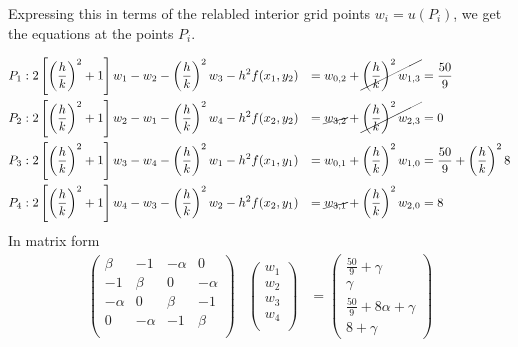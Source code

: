 \documentclass[12pt]{article}
\begin{document}
Expressing this in terms of the relabled interior grid points
$w_i=u(P_i)$, we get the equations at the points $P_i$.

\begin{equation}
  \label{eq:8_p}
  \begin{aligned}
    P_1&: 2\left[\left(\frac{h}{k}\right)^2+1\right]w_1 - w_2 -
    \left(\frac{h}{k}\right)^2w_3 -
    h^2f(x_1,y_2)&=w_{0,2}+\cancel{\left(\frac{h}{k}\right)^2w_{1,3}} &=
    \frac{50}{9} \\
    P_2&: 2\left[\left(\frac{h}{k}\right)^2+1\right]w_2 - w_1 -
    \left(\frac{h}{k}\right)^2w_4 -
    h^2f(x_2,y_2)&=\cancel{w_{3,2}} +
    \cancel{\left(\frac{h}{k}\right)^2w_{2,3}} &=
    0\\
    P_3&: 2\left[\left(\frac{h}{k}\right)^2+1\right]w_3 - w_4 -
    \left(\frac{h}{k}\right)^2w_1 -
    h^2f(x_1,y_1)&=w_{0,1}+\left(\frac{h}{k}\right)^2w_{1,0} &= 
    \frac{50}{9} + \left(\frac{h}{k}\right)^28 \\
    P_4&: 2\left[\left(\frac{h}{k}\right)^2+1\right]w_4 - w_3 -
    \left(\frac{h}{k}\right)^2w_2 -
    h^2f(x_2,y_1)&=\cancel{w_{3,1}}+\left(\frac{h}{k}\right)^2w_{2,0} &=
    8\\
  \end{aligned}
\end{equation}
In matrix form
\begin{equation}
  \label{eq:8_matrix}
  \begin{array}{ccc}
  \begin{pmatrix}
    \beta & -1 & -\alpha & 0 \\
    -1 & \beta & 0 & -\alpha \\
    -\alpha & 0 & \beta & -1 \\
    0 & -\alpha & -1 & \beta \\
  \end{pmatrix}
  & 
  \begin{pmatrix}
    w_1 \\
    w_2 \\
    w_3 \\
    w_4 \\
  \end{pmatrix}
  &=
  \begin{pmatrix}
    \frac{50}{9} + \gamma \\
    \gamma \\
    \frac{50}{9} + 8\alpha + \gamma \\
    8 + \gamma
  \end{pmatrix}
\end{array}
\end{equation}
\end{document}
